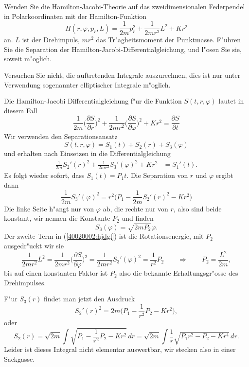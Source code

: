 Wenden Sie die Hamilton-Jacobi-Theorie auf das
zweidimensionalen Federpendel in Polarkoordinaten mit der Hamilton-Funktion 
\[
H(r,\varphi,p_r, L)=\frac1{2m}p_r^2+\frac1{2mr^2}L^2+Kr^2
\]
an.  $L$ ist der Drehimpuls, $mr^2$ das Tr"agheitsmoment
der Punktmasse.
F"uhren Sie die Separation der Hamilton-Jacobi-Differentialgleichung,
und l"osen Sie sie, soweit m"oglich.

\begin{hinweis}
Versuchen Sie nicht, die auftretenden Integrale auszurechnen, dies
ist nur unter Verwendung sogenannter elliptischer Integrale m"oglich. 
\end{hinweis}

\begin{loesung}
Die Hamilton-Jacobi Differentialgleichung f"ur die Funktion
$S(t,r,\varphi)$ lautet in diesem Fall
\begin{equation}
\frac1{2m}\biggl(\frac{\partial S}{\partial r}\biggr)^2
+\frac1{2mr^2}\biggl(\frac{\partial S}{\partial \varphi}\biggr)^2
+Kr^2
=
\frac{\partial S}{\partial t}
\label{40020002:hjdgl}
\end{equation}
Wir verwenden den Separationsansatz
\[
S(t,r,\varphi)=S_1(t)+S_2(r)+S_3(\varphi)
\]
und erhalten nach Einsetzen in die Differentialgleichung
\begin{align*}
\frac1{2m}S_2'(r)^2+\frac1{2mr^2}S_3'(\varphi)^2 + Kr^2&=S_1'(t).
\end{align*}
Es folgt wieder sofort, dass $S_1(t)=P_1t$.
Die Separation von $r$ und $\varphi$ ergibt dann
\[
\frac1{2m}S_3'(\varphi)^2=r^2\biggl(P_1-\frac1{2m}S_2'(r)^2-Kr^2\biggr)
\]
Die linke Seite h"angt nur von $\varphi$ ab, die rechte nur von $r$,
also sind beide konstant, wir nennen die Konstante $P_2$ und finden
\[
S_3(\varphi)
=
\sqrt{2mP_2}\varphi.
\]
Der zweite Term in (\ref{40020002:hjdgl}) ist die Rotationsenergie,
mit $P_2$ ausgedr"uckt wir sie
\[
\frac1{2mr^2}{L^2}
=
\frac1{2mr^2}\biggl(\frac{\partial S}{\partial \varphi}\biggr)^2
=
\frac1{2mr^2}S_3'(\varphi)^2=\frac1{r^2}P_2
\qquad\Rightarrow\qquad
P_2=\frac{L^2}{2m},
\]
bis auf einen konstanten Faktor ist $P_2$ also die bekannte Erhaltungsgr"osse
des Drehimpulses.

F"ur $S_3(r)$ findet man jetzt den Ausdruck
\[
S_2'(r)^2=2m\biggl(P_1-\frac1{r^2}P_2-Kr^2\biggr),
\]
oder
\begin{equation}
S_2(r)
=
\sqrt{2m}\int\sqrt{P_1-\frac1{r^2}P_2-Kr^2}\,dr
=
\sqrt{2m}
\int
\frac1r
\sqrt{P_1r^2-P_2-Kr^4}\,dr.
\label{40020002:integral}
\end{equation}
Leider ist dieses Integral nicht elementar auswertbar, wir stecken also
in einer Sackgasse.
\end{loesung}

